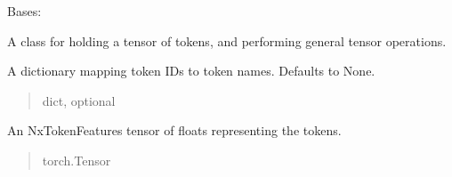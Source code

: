 \documentclass[letterpaper,10pt,english]{sphinxmanual}
\begin{document}
\begin{fulllineitems}
\label{\detokenize{nodes:nodes.nodeTensors.Tokens}}
\pysigstartsignatures
\pysiglinewithargsret
{}
{\sphinxparamcomma {}\sphinxparamcomma {}\sphinxparamcomma {}}
{}
\pysigstopsignatures
\sphinxAtStartPar
Bases: 

\sphinxAtStartPar
A class for holding a tensor of tokens, and performing general tensor operations.

\begin{fulllineitems}
\label{\detokenize{nodes:nodes.nodeTensors.Tokens.names}}
\pysigstartsignatures
\pysigline
{}
\pysigstopsignatures
\sphinxAtStartPar
A dictionary mapping token IDs to token names. Defaults to None.
\begin{quote}\begin{description}
\sphinxAtStartPar
dict, optional

\end{description}\end{quote}

\end{fulllineitems}


\begin{fulllineitems}
\label{\detokenize{nodes:nodes.nodeTensors.Tokens.nodes}}
\pysigstartsignatures
\pysigline
{}
\pysigstopsignatures
\sphinxAtStartPar
An NxTokenFeatures tensor of floats representing the tokens.
\begin{quote}\begin{description}
\sphinxAtStartPar
torch.Tensor

\end{description}\end{quote}


\end{fulllineitems}
\end{fulllineitems}
\end{document}
